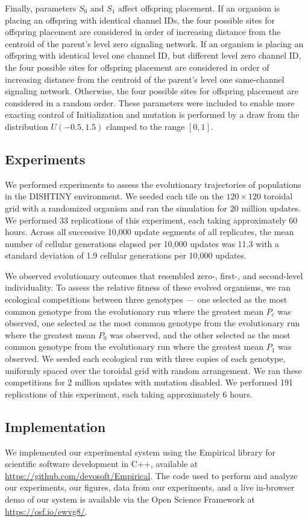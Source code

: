 Finally, parameters $S_0$ and $S_1$ affect offspring placement.
If an organism is placing an offspring with identical channel IDs, the four possible sites for offspring placement are considered in order of increasing distance from the centroid of the parent's level zero signaling network.
If an organism is placing an offspring with identical level one channel ID, but different level zero channel ID, the four possible sites for offspring placement are considered in order of increasing distance from the centroid of the parent's level one same-channel signaling network.
Otherwise, the four possible sites for offspring placement are considered in a random order.
These parameters were included to enable more exacting control of
Initialization and mutation is performed by a draw from the distribution $U(-0.5,1.5)$ clamped to the range $[0,1]$.

\subsection{Experiments}

We performed experiments to assess the evolutionary trajectories of populations %
in the DISHTINY environment.
We seeded each tile on the $120 \times 120$ toroidal grid with a randomized organism and ran the simulation for 20 million updates.
We performed 33 replications of this experiment, each taking approximately 60 hours.
Across all successive 10,000 update segments of all replicates, the mean number of cellular generations elapsed per 10,000 updates was 11.3 with a standard deviation of 1.9 cellular generations per 10,000 updates.

We observed evolutionary outcomes that resembled zero-, first-, and second-level individuality.
To assess the relative fitness of these evolved organisms, we ran ecological competitions between three genotypes --- one selected as the most common genotype from the evolutionary run where the greatest mean $P_{c}$ was observed, one selected as the most common genotype from the evolutionary run where the greatest mean $P_0$ was observed, and the other selected as the most common genotype from the evolutionary run where the greatest mean $P_1$ was observed.
We seeded each ecological run with three copies of each genotype, uniformly spaced over the toroidal grid with random arrangement. We ran these competitions for 2 million updates with mutation disabled.
We performed 191 replications of this experiment, each taking approximately 6 hours.


\subsection{Implementation}


We implemented our experimental system using the Empirical library for scientific software development in C++, available at \url{https://github.com/devosoft/Empirical}.  The code used to perform and analyze our experiments, our figures, data from our experiments, and a live in-browser demo of our system is available via the Open Science Framework at \url{https://osf.io/ewvg8/}.
